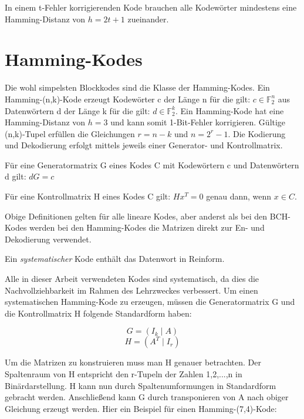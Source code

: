 \begin{t_def}
In einem t-Fehler korrigierenden Kode brauchen alle Kodewörter mindestens eine Hamming-Distanz von $h=2t+1$ zueinander.
\end{t_def}


\section{Hamming-Kodes}
\label{section:hamming}

Die wohl simpelsten Blockkodes sind die Klasse der Hamming-Kodes. Ein Hamming-(n,k)-Kode erzeugt Kodewörter c der Länge n für die gilt: $c \in \mathbb{F}_{2}^{n}$ aus Datenwörtern d der Länge k für die gilt: $d \in \mathbb{F}_{2}^{k}$. Ein Hamming-Kode hat eine Hamming-Distanz von $h=3$ und kann somit 1-Bit-Fehler korrigieren. Gültige (n,k)-Tupel erfüllen die Gleichungen $r = n - k$ und $n = 2^r - 1$.\cite[Kap. 1.8]{huffman2010fundamentals} Die Kodierung und Dekodierung erfolgt mittels jeweils einer Generator- und Kontrollmatrix.

\begin{t_def}
Für eine Generatormatrix G eines Kodes C mit Kodewörtern c und Datenwörtern d gilt: $ dG = c$
\end{t_def}

\begin{t_def}
Für eine Kontrollmatrix H eines Kodes C gilt: $ Hx^T = 0$ genau dann, wenn $x \in C$.
\end{t_def}

Obige Definitionen gelten für alle lineare Kodes\cite[Kap. 1.2]{huffman2010fundamentals}, aber anderst als bei den BCH-Kodes werden bei den Hamming-Kodes die Matrizen direkt zur En- und Dekodierung verwendet.

\begin{t_def}
Ein {\em systematischer} Kode enthält das Datenwort in Reinform.
\end{t_def}

Alle in dieser Arbeit verwendeten Kodes sind systematisch, da dies die Nachvollziehbarkeit im Rahmen des Lehrzweckes verbessert. Um einen systematischen Hamming-Kode zu erzeugen, müssen die Generatormatrix G und die Kontrollmatrix H folgende Standardform\cite[Kap. 1.1.3]{morelos2006art} haben: 

$$G = \left(I_k \mid A\right)$$
$$H = \left(A^T \mid I_r\right)$$

Um die Matrizen zu konstruieren muss man H genauer betrachten. Der Spaltenraum von H entspricht den r-Tupeln der Zahlen 1,2,...,n in Binärdarstellung. H kann nun durch Spaltenumformungen in Standardform gebracht werden. 
Anschließend kann G durch transponieren von A nach obiger Gleichung erzeugt werden.\cite[Kap. 1.8]{huffman2010fundamentals} Hier ein Beispiel für einen Hamming-(7,4)-Kode:

